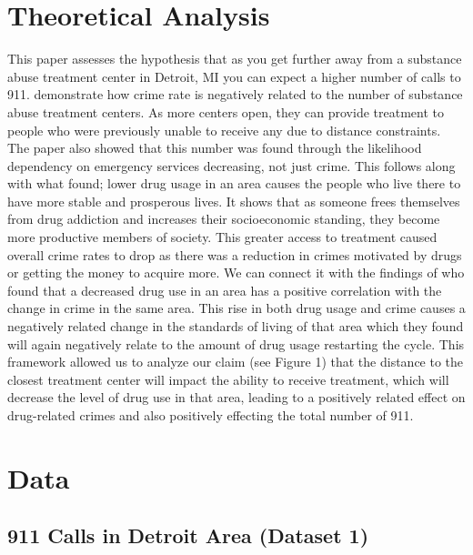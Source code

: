 \documentclass[12pt]{article}
\begin{document}
\section{Theoretical Analysis}
\label{sec:theory}
This paper assesses the hypothesis that as you get further away from a substance abuse treatment center in Detroit, MI you can expect a higher number of calls to 911. \cite{SAT_centers_and_crime} demonstrate how crime rate is negatively related to the number of substance abuse treatment centers. As more centers open, they can provide treatment to people who were previously unable to receive any due to distance constraints. The paper also showed that this number was found through the likelihood dependency on emergency services decreasing, not just crime. This follows along with what \cite{Socioeconomic-Determinants} found;  lower drug usage in an area causes the people who live there to have more stable and prosperous lives. It shows that as someone frees themselves from drug addiction and increases their socioeconomic standing, they become more productive members of society. This greater access to treatment caused overall crime rates to drop as there was a reduction in crimes motivated by drugs or getting the money to acquire more. We can connect it with the findings of \cite{drugs_and_crime} who found that a decreased drug use in an area has a positive correlation with the change in crime in the same area. This rise in both drug usage and crime causes a negatively related change in the standards of living of that area which they found will again negatively relate to the amount of drug usage restarting the cycle. This framework allowed us to analyze our claim (see Figure 1) that the distance to the closest treatment center will impact the ability to receive treatment, which will decrease the level of drug use in that area, leading to a positively related effect on drug-related crimes and also positively effecting the total number of 911. 



\section{Data}
\label{sec:data}

\subsection{911 Calls in Detroit Area (Dataset 1)}
\end{document}
